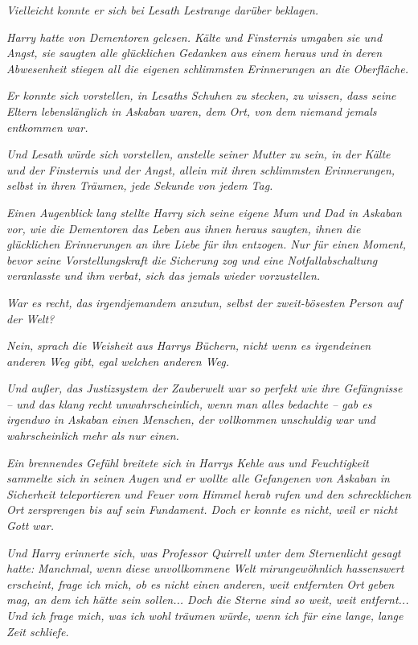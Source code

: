 {\emph{Vielleicht konnte er sich bei Lesath Lestrange darüber beklagen.}

\emph{Harry hatte von Dementoren gelesen. Kälte und Finsternis umgaben sie und Angst, sie saugten alle glücklichen Gedanken aus einem heraus und in} \emph{deren} \emph{Abwesenheit stiegen all die eigenen schlimmsten Erinnerungen an die Oberfläche.}

\emph{Er konnte sich vorstellen, in Lesaths Schuhen zu stecken, zu wissen, dass seine Eltern lebenslänglich in Askaban waren, dem Ort, von dem niemand jemals entkommen war.}

\emph{Und Lesath würde sich vorstellen, anstelle seiner Mutter zu sein, in der Kälte und der Finsternis und der Angst, allein mit ihren schlimmsten Erinnerungen, selbst in ihren Träumen, jede Sekunde von jedem Tag.}

\emph{Einen Augenblick lang stellte Harry sich seine eigene Mum und Dad in Askaban vor, wie die Dementoren das Leben aus ihnen heraus saugten, ihnen die glücklichen Erinnerungen an ihre Liebe für ihn entzogen. Nur für einen Moment, bevor seine Vorstellungskraft die Sicherung zog und eine Notfallabschaltung veranlasste und ihm verbat, sich das jemals wieder vorzustellen.}

\emph{War es recht,} \emph{das} \emph{irgendjemandem anzutun, selbst der zweit-bösesten Person auf der Welt?}

\emph{\emph{Nein,}} \emph{sprach} \emph{die Weisheit aus Harrys Büchern,} \emph{\emph{nicht wenn es irgendeinen anderen Weg gibt, egal welchen anderen Weg.}}

\emph{Und außer, das Justizsystem der Zauberwelt war so perfekt wie ihre Gefängnisse -- und das klang recht unwahrscheinlich, wenn man alles bedachte -- gab es irgendwo in Askaban einen Menschen, der vollkommen} \emph{unschuldig war und wahrscheinlich mehr als nur einen.}

\emph{Ein brennendes Gefühl breitete sich in Harrys Kehle aus und Feuchtigkeit sammelte sich in seinen Augen und er wollte alle Gefangenen von Askaban in Sicherheit teleportieren und Feuer vom Himmel herab rufen und den schrecklichen Ort} \emph{zersprengen bis auf sein Fundament. Doch er konnte es nicht, weil er nicht Gott war.}

\emph{Und Harry erinnerte sich, was Professor Quirrell unter dem Sternenlicht gesagt hatte:} \emph{\emph{Manchmal,}} \emph{\emph{wenn diese unvollkommene Welt}} \emph{\emph{mir}\emph{ungewöhnlich}} \emph{\emph{hassenswert erscheint, frage ich mich, ob es nicht einen anderen,}} \emph{\emph{weit entfernten}} \emph{\emph{Ort}} \emph{\emph{geben mag}\emph{, an dem ich hätte sein sollen}\emph{... Doch die Sterne sind so weit, weit entfernt... Und ich frage mich, was ich wohl träumen würde, wenn ich für eine lange, lange Zeit schliefe.}}

}
